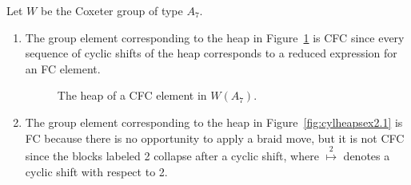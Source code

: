 \begin{example} \label{ex:CFC} Let $W$ be the Coxeter group of type $A_7$.
\begin{enumerate}[leftmargin=0.75in, label=(\alph*)]
\item The group element corresponding to the heap in Figure~\ref{fig:cylheapsex1} is CFC since every sequence of cyclic shifts of the heap corresponds to a reduced expression for an FC element.
\begin{center} \begin{figure}[H] \centering {}
\caption{The heap of a CFC element in $W(A_7)$.}\label{fig:cylheapsex1} \end{figure} \end{center}

\item The group element corresponding to the heap in Figure~\ref{fig:cylheapsex2.1} is FC because there is no opportunity to apply a braid move, but it is not CFC since the blocks labeled 2 collapse after a cyclic shift, where $\overset{2}{\mapsto}$ denotes a cyclic shift with respect to 2.


\end{enumerate}
\end{example}
